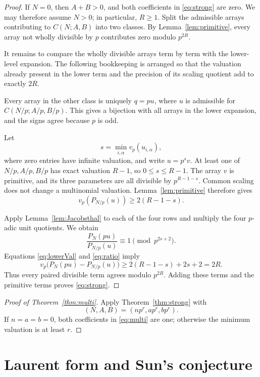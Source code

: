 \documentclass[11pt,reqno]{amsart}
\numberwithin{equation}{section}
\theoremstyle{remark}
\newcommand{\vp}{v_p}
\begin{document}
\begin{proof}
If \(N=0\), then \(A+B>0\), and both coefficients in
\eqref{eq:strong} are zero.  We may therefore assume \(N>0\); in
particular, \(R\geq1\).
Split the admissible arrays contributing to \(C(N;A,B)\) into two classes.
By Lemma~\ref{lem:primitive}, every array not wholly divisible by \(p\)
contributes zero modulo \(p^{2R}\).

It remains to compare the wholly divisible arrays term by term with the
lower-level expansion.  The following bookkeeping is arranged so that the
valuation already present in the lower term and the precision of its scaling
quotient add to exactly \(2R\).

Every array in the other class is uniquely \(q=pu\), where \(u\) is
admissible for \(C(N/p;A/p,B/p)\).  This gives a bijection with all arrays
in the lower expansion, and the signs agree because \(p\) is odd.

Let
\[
s=\min_{i,\alpha}\vp(u_{i,\alpha}),
\]
where zero entries have infinite valuation, and write \(u=p^sv\).
At least one of \(N/p,A/p,B/p\) has exact valuation \(R-1\), so
\(0\leq s\leq R-1\).  The array \(v\) is primitive, and its three
parameters are all divisible by \(p^{R-1-s}\).  Common scaling does not
change a multinomial valuation.  Lemma~\ref{lem:primitive} therefore gives
\begin{equation}\label{eq:lowerVal}
\vp(P_{N/p}(u))\geq2(R-1-s).
\end{equation}

Apply Lemma~\ref{lem:Jacobsthal} to each of the four rows and multiply the
four \(p\)-adic unit quotients.  We obtain
\begin{equation}\label{eq:ratio}
\frac{P_N(pu)}{P_{N/p}(u)}
\equiv1\pmod {p^{2s+2}}.
\end{equation}
Equations \eqref{eq:lowerVal} and \eqref{eq:ratio} imply
\[
\vp\bigl(P_N(pu)-P_{N/p}(u)\bigr)
\geq2(R-1-s)+2s+2=2R.
\]
Thus every paired divisible term agrees modulo \(p^{2R}\).  Adding these
terms and the primitive terms proves \eqref{eq:strong}.
\end{proof}

\begin{proof}[Proof of Theorem~\ref{thm:multi}]
Apply Theorem~\ref{thm:strong} with
\[
(N,A,B)=(np^r,ap^r,bp^r).
\]
If \(n=a=b=0\), both coefficients in \eqref{eq:multi} are one; otherwise
the minimum valuation is at least \(r\).
\end{proof}

\section{Laurent form and Sun's conjecture}
\end{document}
